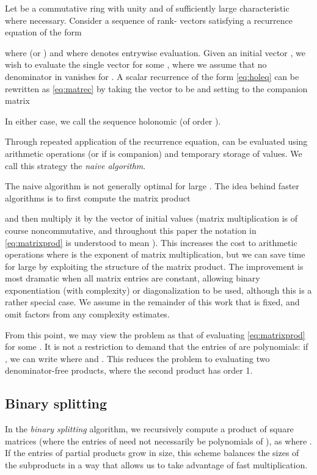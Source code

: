 \documentclass{sig-alternate}
\begin{document}
Let  be a commutative ring with unity and of sufficiently
large characteristic where necessary. 
Consider a sequence of rank- vectors 
satisfying a recurrence equation of the form

where  (or )
and where  denotes entrywise
evaluation. Given an initial vector , we wish to evaluate
the single vector  for some , where we assume that no
denominator in  vanishes for .
A scalar recurrence of the form \eqref{eq:holeq}
can be rewritten as \eqref{eq:matrec} by taking the vector
to be  and setting 
to the companion matrix

In either case, we call the sequence holonomic (of order ).

Through repeated application of the recurrence equation,
 can be evaluated using  arithmetic operations
(or  if  is companion) and temporary storage of  values.
We call this strategy the \emph{naive algorithm}.

The naive algorithm is not generally
optimal for large . The idea
behind faster algorithms is to first compute the matrix product

and then multiply it by the vector of initial values
(matrix multiplication is of course noncommutative,
and throughout this paper the notation in \eqref{eq:matrixprod} is understood to mean
).
This increases the cost to 
arithmetic operations where  is the exponent of matrix
multiplication, but we can save time for large  by
exploiting the structure of the matrix product.
The improvement is most dramatic when all matrix entries are constant,
allowing binary exponentiation (with  complexity)
or diagonalization to be used,
although this is a rather special case.
We assume in the
remainder of this work that  is fixed,
and omit  factors from
any complexity estimates.

From this point, we may view the problem
as that of evaluating
\eqref{eq:matrixprod} for some .
It is not a restriction to demand
that the entries of  are polynomials: if ,
we can write  where
 and
. This reduces the
problem to evaluating two denominator-free products,
where the second product has order 1.

\subsection{Binary splitting}

In the \emph{binary splitting} algorithm, we recursively compute a
product of square matrices
 (where the
entries of  need not necessarily be polynomials of ), 
as
 where .
If the entries of partial products grow in size,
this scheme balances the sizes of the subproducts in a way
that allows us to take advantage of fast multiplication.
\end{document}
